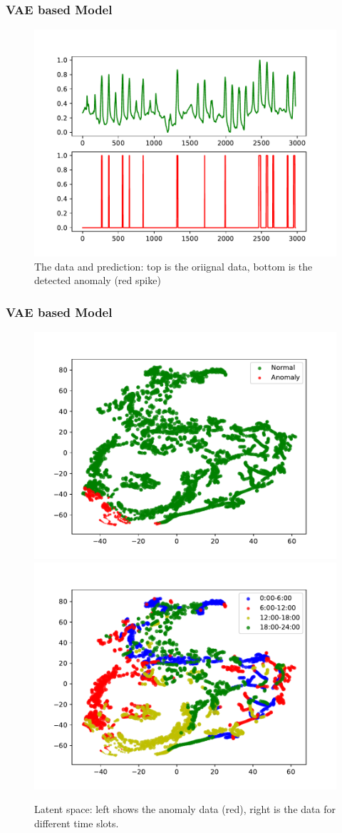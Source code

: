 \documentclass{beamer}
\begin{document}
\begin{frame}
\begin{frame}
\begin{frame}
\begin{frame}
\begin{frame}
\end{frame}


\begin{frame}
\frametitle{VAE based Model}
\begin{figure}
\includegraphics[width=0.8\linewidth]{figs/vae_detect.pdf}
\vspace{-0.3in}
\caption{The data and prediction: top is the oriignal data, bottom is the detected anomaly (red spike)}
\end{figure}
\end{frame}


\begin{frame}
\frametitle{VAE based Model}
\begin{figure}
\includegraphics[width=0.45\linewidth]{figs/vae_latent_anomaly.pdf}
\includegraphics[width=0.45\linewidth]{figs/vae_latent_time.pdf}
\vspace{-0.2in}
\caption{Latent space: left shows the anomaly data (red), right is the data for different time slots.}
\end{figure}
\vspace{-0.1in}


\end{frame}
\end{frame}
\end{frame}
\end{frame}
\end{frame}
\end{document}

